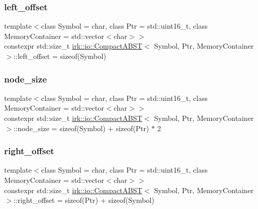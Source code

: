 \subsubsection{\texorpdfstring{left\+\_\+offset}{left\_offset}}
{\footnotesize\ttfamily template$<$class Symbol = char, class Ptr = std\+::uint16\+\_\+t, class Memory\+Container = std\+::vector$<$char$>$$>$ \\
constexpr std\+::size\+\_\+t \mbox{\hyperlink{classirk_1_1io_1_1CompactABST}{irk\+::io\+::\+Compact\+A\+B\+ST}}$<$ Symbol, Ptr, Memory\+Container $>$\+::left\+\_\+offset = sizeof(Symbol)\hspace{0.3cm}{\ttfamily [static]}}

\mbox{\label{classirk_1_1io_1_1CompactABST_a7d730c8d8ba0519397927b08dea7dbbb}} 
\subsubsection{\texorpdfstring{node\+\_\+size}{node\_size}}
{\footnotesize\ttfamily template$<$class Symbol = char, class Ptr = std\+::uint16\+\_\+t, class Memory\+Container = std\+::vector$<$char$>$$>$ \\
constexpr std\+::size\+\_\+t \mbox{\hyperlink{classirk_1_1io_1_1CompactABST}{irk\+::io\+::\+Compact\+A\+B\+ST}}$<$ Symbol, Ptr, Memory\+Container $>$\+::node\+\_\+size = sizeof(Symbol) + sizeof(Ptr) $\ast$ 2\hspace{0.3cm}{\ttfamily [static]}}

\mbox{\label{classirk_1_1io_1_1CompactABST_acfc39a4d86afda151c70354230614cb4}} 
\subsubsection{\texorpdfstring{right\+\_\+offset}{right\_offset}}
{\footnotesize\ttfamily template$<$class Symbol = char, class Ptr = std\+::uint16\+\_\+t, class Memory\+Container = std\+::vector$<$char$>$$>$ \\
constexpr std\+::size\+\_\+t \mbox{\hyperlink{classirk_1_1io_1_1CompactABST}{irk\+::io\+::\+Compact\+A\+B\+ST}}$<$ Symbol, Ptr, Memory\+Container $>$\+::right\+\_\+offset = sizeof(Ptr) + sizeof(Symbol)\hspace{0.3cm}{\ttfamily [static]}}

